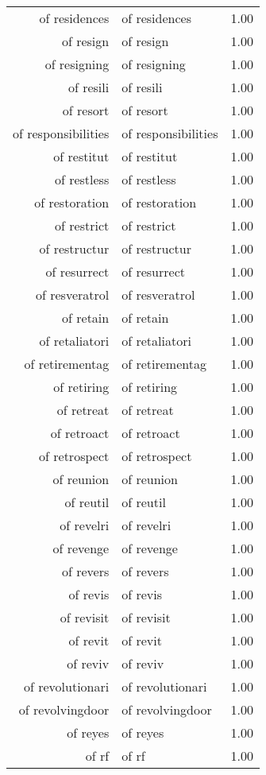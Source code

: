 \begin{table}[ht]
\begin{tabular}{rlr}
  of residences & of residences & 1.00 \\ 
  of resign & of resign & 1.00 \\ 
  of resigning & of resigning & 1.00 \\ 
  of resili & of resili & 1.00 \\ 
  of resort & of resort & 1.00 \\ 
  of responsibilities & of responsibilities & 1.00 \\ 
  of restitut & of restitut & 1.00 \\ 
  of restless & of restless & 1.00 \\ 
  of restoration & of restoration & 1.00 \\ 
  of restrict & of restrict & 1.00 \\ 
  of restructur & of restructur & 1.00 \\ 
  of resurrect & of resurrect & 1.00 \\ 
  of resveratrol & of resveratrol & 1.00 \\ 
  of retain & of retain & 1.00 \\ 
  of retaliatori & of retaliatori & 1.00 \\ 
  of retirementag & of retirementag & 1.00 \\ 
  of retiring & of retiring & 1.00 \\ 
  of retreat & of retreat & 1.00 \\ 
  of retroact & of retroact & 1.00 \\ 
  of retrospect & of retrospect & 1.00 \\ 
  of reunion & of reunion & 1.00 \\ 
  of reutil & of reutil & 1.00 \\ 
  of revelri & of revelri & 1.00 \\ 
  of revenge & of revenge & 1.00 \\ 
  of revers & of revers & 1.00 \\ 
  of revis & of revis & 1.00 \\ 
  of revisit & of revisit & 1.00 \\ 
  of revit & of revit & 1.00 \\ 
  of reviv & of reviv & 1.00 \\ 
  of revolutionari & of revolutionari & 1.00 \\ 
  of revolvingdoor & of revolvingdoor & 1.00 \\ 
  of reyes & of reyes & 1.00 \\ 
  of rf & of rf & 1.00 \\ 

\end{tabular}
\end{table}
